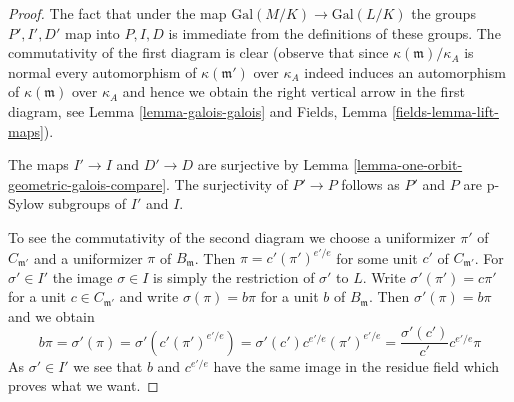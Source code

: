 \begin{proof}
The fact that under the map $\text{Gal}(M/K) \to \text{Gal}(L/K)$
the groups $P', I', D'$ map into $P, I, D$ is immediate from the
definitions of these groups. The commutativity of the first diagram
is clear (observe that since $\kappa(\mathfrak m)/\kappa_A$ is normal
every automorphism of $\kappa(\mathfrak m')$ over $\kappa_A$ indeed
induces an automorphism of $\kappa(\mathfrak m)$ over $\kappa_A$
and hence we obtain the right vertical arrow in the first diagram, see
Lemma \ref{lemma-galois-galois} and
Fields, Lemma \ref{fields-lemma-lift-maps}).

\medskip\noindent
The maps $I' \to I$ and $D' \to D$ are surjective by
Lemma \ref{lemma-one-orbit-geometric-galois-compare}.
The surjectivity of $P' \to P$ follows as $P'$ and $P$
are p-Sylow subgroups of $I'$ and $I$.

\medskip\noindent
To see the commutativity of the second diagram we choose a uniformizer
$\pi'$ of $C_{\mathfrak m'}$ and a uniformizer $\pi$ of $B_\mathfrak m$.
Then $\pi = c' (\pi')^{e'/e}$ for some unit $c'$ of $C_{\mathfrak m'}$.
For $\sigma' \in I'$ the image $\sigma \in I$ is simply the restriction
of $\sigma'$ to $L$. Write $\sigma'(\pi') = c \pi'$ for a unit
$c \in C_{\mathfrak m'}$ and write
$\sigma(\pi) = b \pi$ for a unit $b$ of $B_\mathfrak m$.
Then $\sigma'(\pi) = b \pi$ and we obtain
$$
b \pi = \sigma'(\pi) = \sigma'(c' (\pi')^{e'/e}) =
\sigma'(c') c^{e'/e} (\pi')^{e'/e} =
\frac{\sigma'(c')}{c'} c^{e'/e} \pi
$$
As $\sigma' \in I'$ we see that $b$ and $c^{e'/e}$ have the same
image in the residue field which proves what we want.
\end{proof}

